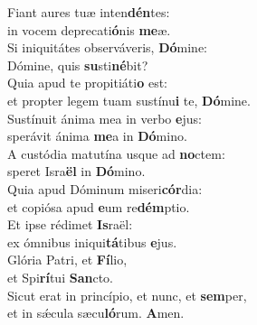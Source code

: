 \evenverse Fiant aures tuæ inten\textbf{dén}tes:~\*\\
\evenverse in vocem deprecati\textbf{ó}nis \textbf{me}æ.\\
\oddverse Si iniquitátes observáveris, \textbf{Dó}mine:~\*\\
\oddverse Dómine, quis \textbf{su}sti\textbf{né}bit?\\
\evenverse Quia apud te propitiáti\textbf{o} est:~\*\\
\evenverse et propter legem tuam sustínu\textbf{i} te, \textbf{Dó}mine.\\
\oddverse Sustínuit ánima mea in verbo \textbf{e}jus:~\*\\
\oddverse sperávit ánima \textbf{me}a in \textbf{Dó}mino.\\
\evenverse A custódia matutína usque ad \textbf{no}ctem:~\*\\
\evenverse speret Isra\textbf{ël} in \textbf{Dó}mino.\\
\oddverse Quia apud Dóminum miseri\textbf{cór}dia:~\*\\
\oddverse et copiósa apud \textbf{e}um re\textbf{dém}ptio.\\
\evenverse Et ipse rédimet \textbf{Is}raël:~\*\\
\evenverse ex ómnibus iniqui\textbf{tá}tibus \textbf{e}jus.\\
\oddverse Glória Patri, et \textbf{Fí}lio,~\*\\
\oddverse et Spi\textbf{rí}tui \textbf{San}cto.\\
\evenverse Sicut erat in princípio, et nunc, et \textbf{sem}per,~\*\\
\evenverse et in sǽcula sæcu\textbf{ló}rum. \textbf{A}men.\\
